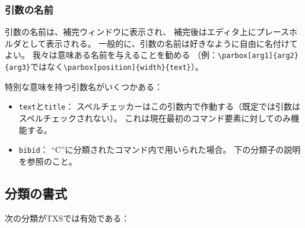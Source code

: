 \subsubsection{引数の名前}

引数の名前は、補完ウィンドウに表示され、
補完後はエディタ上にプレースホルダとして表示される。
一般的に、引数の名前は好きなように自由に名付けてよい。
我々は意味ある名前を与えることを勧める
（例：\verb+\parbox[arg1]{arg2}{arg3}+ではなく\verb+\parbox[position]{width}{text}+）。

特別な意味を持つ引数名がいくつかある：

\begin{itemize}
\item
  \verb+text+と\verb+title+：
  スペルチェッカーはこの引数内で作動する（既定では引数はスペルチェックされない）。
  これは現在最初のコマンド要素に対してのみ機能する。
\item
  \verb+bibid+： ``C''に分類されたコマンド内で用いられた場合。
  下の分類子の説明を参照のこと。
\end{itemize}

\subsection{分類の書式}

次の分類がTXSでは有効である：

